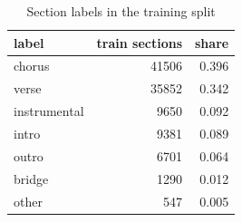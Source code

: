 \begin{table}[t]
\centering
\small
\begin{tabular}{lrr}
\toprule
label & train sections & share \\
\midrule
chorus & 41506 & 0.396 \\
verse & 35852 & 0.342 \\
instrumental & 9650 & 0.092 \\
intro & 9381 & 0.089 \\
outro & 6701 & 0.064 \\
bridge & 1290 & 0.012 \\
other & 547 & 0.005 \\
\bottomrule
\end{tabular}
\caption{Section labels in the training split}
\label{tab:table1b_section_labels}
\end{table}
